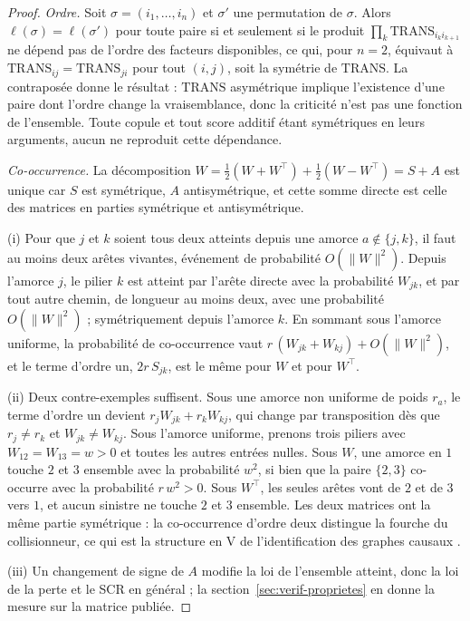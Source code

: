 \begin{proof}
\emph{Ordre.} Soit $\sigma=(i_1,\dots,i_n)$ et $\sigma'$ une permutation de $\sigma$. Alors
$\ell(\sigma)=\ell(\sigma')$ pour toute paire si et seulement si le produit
$\prod_k \mathrm{TRANS}_{i_k i_{k+1}}$ ne dépend pas de l'ordre des facteurs disponibles, ce qui,
pour $n=2$, équivaut à $\mathrm{TRANS}_{ij}=\mathrm{TRANS}_{ji}$ pour tout $(i,j)$, soit la
symétrie de $\mathrm{TRANS}$. La contraposée donne le résultat : $\mathrm{TRANS}$ asymétrique
implique l'existence d'une paire dont l'ordre change la vraisemblance, donc la criticité n'est
pas une fonction de l'ensemble. Toute copule et tout score additif étant symétriques en leurs
arguments, aucun ne reproduit cette dépendance.

\emph{Co-occurrence.} La décomposition $W=\tfrac12(W+W^\top)+\tfrac12(W-W^\top)=S+A$ est
unique car $S$ est symétrique, $A$ antisymétrique, et cette somme directe est celle des
matrices en parties symétrique et antisymétrique.

(i) Pour que $j$ et $k$ soient tous deux atteints depuis une amorce $a\notin\{j,k\}$, il faut au
moins deux arêtes vivantes, événement de probabilité $O(\lVert W\rVert^2)$. Depuis l'amorce $j$,
le pilier $k$ est atteint par l'arête directe avec la probabilité $W_{jk}$, et par tout autre
chemin, de longueur au moins deux, avec une probabilité $O(\lVert W\rVert^2)$ ; symétriquement
depuis l'amorce $k$. En sommant sous l'amorce uniforme, la probabilité de co-occurrence vaut
$r\,(W_{jk}+W_{kj})+O(\lVert W\rVert^2)$, et le terme d'ordre un, $2r\,S_{jk}$, est le même pour
$W$ et pour $W^\top$.

(ii) Deux contre-exemples suffisent. Sous une amorce non uniforme de poids $r_a$, le terme
d'ordre un devient $r_j W_{jk}+r_k W_{kj}$, qui change par transposition dès que $r_j\neq r_k$ et
$W_{jk}\neq W_{kj}$. Sous l'amorce uniforme, prenons trois piliers avec $W_{12}=W_{13}=w>0$ et
toutes les autres entrées nulles. Sous $W$, une amorce en $1$ touche $2$ et $3$ ensemble avec la
probabilité $w^2$, si bien que la paire $\{2,3\}$ co-occurre avec la probabilité $r\,w^2>0$. Sous
$W^\top$, les seules arêtes vont de $2$ et de $3$ vers $1$, et aucun sinistre ne touche $2$ et $3$
ensemble. Les deux matrices ont la même partie symétrique : la co-occurrence d'ordre deux
distingue la fourche du collisionneur, ce qui est la structure en V de l'identification des
graphes causaux \citep{verma1990equivalence}.

(iii) Un changement de signe de $A$ modifie la loi de l'ensemble atteint, donc la loi de la perte
et le SCR en général ; la section~\ref{sec:verif-proprietes} en donne la mesure sur la matrice
publiée.
\end{proof}

